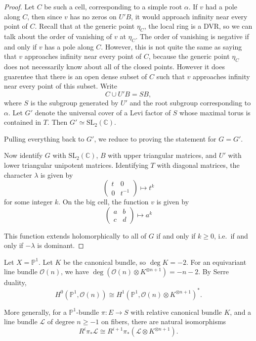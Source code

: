 \documentclass[12pt]{article}
\begin{document}
\begin{proof}
    Let $C$ be such a cell, corresponding to a simple root $\alpha$. If $v$ had a pole along $C$, then since $v$ has no zeros on $U'B$, it would approach infinity near every point of $C$. Recall that at the generic point $\eta_C$, the local ring is a DVR, so we can talk about the order of vanishing of $v$ at $\eta_C$. The order of vanishing is negative if and only if $v$ has a pole along $C$. However, this is not quite the same as saying that $v$ approaches infinity near every point of $C$, because the generic point $\eta_C$ does not necessarily know about all of the closed points. However it does guarentee that there is an open dense subset of $C$ such that $v$ approaches infinity near every point of this subset.
    Write
    \[
        C \cup U'B = SB,
    \]
    where $S$ is the subgroup generated by $U'$ and the root subgroup corresponding to $\alpha$. Let $G'$ denote the universal cover of a Levi factor of $S$ whose maximal torus is contained in $T$. Then $G' \simeq \mathrm{SL}_2(\mathbb{C})$.

    Pulling everything back to $G'$, we reduce to proving the statement for $G = G'$.

    Now identify $G$ with $\mathrm{SL}_2(\mathbb{C})$, $B$ with upper triangular matrices, and $U'$ with lower triangular unipotent matrices. Identifying $T$ with diagonal matrices, the character $\lambda$ is given by
    \[
        \begin{pmatrix}
            t & 0      \\
            0 & t^{-1}
        \end{pmatrix}
        \mapsto t^k
    \]
    for some integer $k$. On the big cell, the function $v$ is given by
    \[
        \begin{pmatrix}
            a & b \\
            c & d
        \end{pmatrix}
        \mapsto a^k
    \]

    This function extends holomorphically to all of $G$ if and only if $k \ge 0$, i.e.\ if and only if $-\lambda$ is dominant.
\end{proof}
Let $X = \mathbb P^1$. Let $K$ be the canonical bundle, so $\deg K = -2$. For an equivariant line bundle $\mathcal O(n)$, we have $\deg(\mathcal O(n)\otimes K^{\otimes n+1}) = -n-2$. By Serre duality,
\[
    H^0(\mathbb P^1,\mathcal O(n)) \cong H^1(\mathbb P^1,\mathcal O(n)\otimes K^{\otimes n+1})^*.
\]

More generally, for a $\mathbb P^1$-bundle $\pi : E \to S$ with relative canonical bundle $K$, and a line bundle $\mathcal L$ of degree $n \ge -1$ on fibers, there are natural isomorphisms
\[
    R^i \pi_* \mathcal L \cong R^{i+1}\pi_*(\mathcal L \otimes K^{\otimes n+1}).
\]
\end{document}
